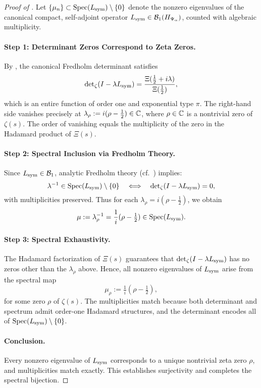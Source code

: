 \begin{proof}[Proof of ]
Let \( \{ \mu_n \} \subset \operatorname{Spec}(L_{\mathrm{sym}}) \setminus \{0\} \) denote the nonzero eigenvalues of the canonical compact, self-adjoint operator \( L_{\mathrm{sym}} \in \mathcal{B}_1(H_{\Psi_\alpha}) \), counted with algebraic multiplicity.

\paragraph{Step 1: Determinant Zeros Correspond to Zeta Zeros.}
By , the canonical Fredholm determinant satisfies
\[
\det\nolimits_{\zeta}(I - \lambda L_{\mathrm{sym}}) = \frac{\Xi(\tfrac{1}{2} + i\lambda)}{\Xi(\tfrac{1}{2})},
\]
which is an entire function of order one and exponential type \( \pi \). The right-hand side vanishes precisely at \( \lambda_\rho := i(\rho - \tfrac{1}{2}) \in \mathbb{C} \), where \( \rho \in \mathbb{C} \) is a nontrivial zero of \( \zeta(s) \). The order of vanishing equals the multiplicity of the zero in the Hadamard product of \( \Xi(s) \).

\paragraph{Step 2: Spectral Inclusion via Fredholm Theory.}
Since \( L_{\mathrm{sym}} \in \mathcal{B}_1 \), analytic Fredholm theory (cf.~\cite[Thm.~3.1]{Simon2005TraceIdeals}) implies:
\[
\lambda^{-1} \in \operatorname{Spec}(L_{\mathrm{sym}}) \setminus \{0\} \quad \Longleftrightarrow \quad \det\nolimits_{\zeta}(I - \lambda L_{\mathrm{sym}}) = 0,
\]
with multiplicities preserved. Thus for each \( \lambda_\rho = i(\rho - \tfrac{1}{2}) \), we obtain
\[
\mu := \lambda_\rho^{-1} = \frac{1}{i}(\rho - \tfrac{1}{2}) \in \operatorname{Spec}(L_{\mathrm{sym}}).
\]

\paragraph{Step 3: Spectral Exhaustivity.}
The Hadamard factorization of \( \Xi(s) \) guarantees that \( \det\nolimits_{\zeta}(I - \lambda L_{\mathrm{sym}}) \) has no zeros other than the \( \lambda_\rho \) above. Hence, all nonzero eigenvalues of \( L_{\mathrm{sym}} \) arise from the spectral map
\[
\mu_\rho := \tfrac{1}{i}(\rho - \tfrac{1}{2}),
\]
for some zero \( \rho \) of \( \zeta(s) \). The multiplicities match because both determinant and spectrum admit order-one Hadamard structures, and the determinant encodes all of \( \operatorname{Spec}(L_{\mathrm{sym}}) \setminus \{0\} \).

\paragraph{Conclusion.}
Every nonzero eigenvalue of \( L_{\mathrm{sym}} \) corresponds to a unique nontrivial zeta zero \( \rho \), and multiplicities match exactly. This establishes surjectivity and completes the spectral bijection.
\end{proof}

